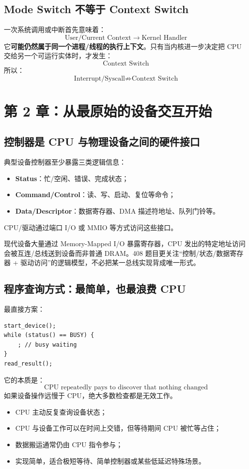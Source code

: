 \documentclass[UTF8,fontset=fandol,11pt,a4paper]{ctexart}
\newcommand{\kw}[1]{\textbf{#1}}
\newcommand{\arr}{\;\longrightarrow\;}
\begin{document}
\subsection{Mode Switch 不等于 Context Switch}
一次系统调用或中断首先意味着：
\[
\text{User/Current Context}\arr\text{Kernel Handler}
\]
它\kw{可能仍然属于同一个进程/线程的执行上下文}。只有当内核进一步决定把 CPU 交给另一个可运行实体时，才发生：
\[
\boxed{\text{Context Switch}}
\]
所以：
\[
\boxed{\text{Interrupt/Syscall} \not\Rightarrow \text{Context Switch}}
\]

\section{第 2 章：从最原始的设备交互开始}

\subsection{控制器是 CPU 与物理设备之间的硬件接口}
典型设备控制器至少暴露三类逻辑信息：
\begin{itemize}
  \item \kw{Status}：忙/空闲、错误、完成状态；
  \item \kw{Command/Control}：读、写、启动、复位等命令；
  \item \kw{Data/Descriptor}：数据寄存器、DMA 描述符地址、队列门铃等。
\end{itemize}
CPU/驱动通过端口 I/O 或 MMIO 等方式访问这些接口。

\begin{eng}
现代设备大量通过 Memory-Mapped I/O 暴露寄存器，CPU 发出的特定地址访问会被互连/总线送到设备而非普通 DRAM。408 题目更关注“控制/状态/数据寄存器 + 驱动访问”的逻辑模型，不必把某一总线实现背成唯一形式。
\end{eng}

\subsection{程序查询方式：最简单，也最浪费 CPU}
最直接方案：
\begin{lstlisting}
start_device();
while (status() == BUSY) {
    ; // busy waiting
}
read_result();
\end{lstlisting}

它的本质是：
\[
\boxed{\text{CPU repeatedly pays to discover that nothing changed}}
\]
如果设备操作远慢于 CPU，绝大多数检查都是无效工作。

\begin{exam}
\begin{itemize}
  \item CPU 主动反复查询设备状态；
  \item CPU 与设备工作可以在时间上交错，但等待期间 CPU 被忙等占住；
  \item 数据搬运通常仍由 CPU 指令参与；
  \item 实现简单，适合极短等待、简单控制器或某些低延迟特殊场景。
\end{itemize}
\end{exam}
\end{document}
